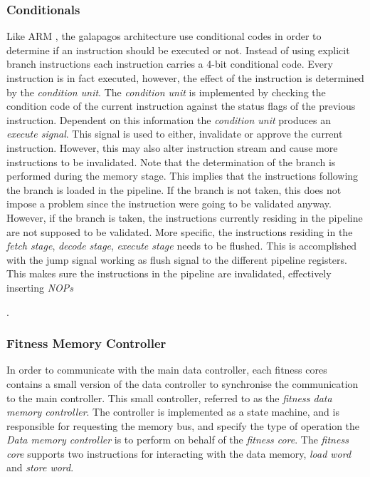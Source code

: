\subsubsection{Conditionals} 
Like ARM , the galapagos architecture use conditional codes in order to determine if an instruction should be executed or not. Instead of using explicit branch instructions each instruction carries a 4-bit conditional code. Every instruction is in fact executed, however, the effect of the instruction is determined by the \emph{condition unit}. The \emph{condition unit} is implemented by checking the condition code of the current instruction against the status flags of the previous instruction. Dependent on this information the \emph{condition unit} produces an \emph{execute signal}. This signal is used to either, invalidate or approve the current instruction. However, this may also alter instruction stream and cause more instructions to be invalidated. Note that the determination of the branch is performed during the memory stage. This implies that the instructions following the branch is loaded in the pipeline. If the branch is not taken, this does not impose a problem since the instruction were going to be validated anyway. However, if the branch is taken, the instructions currently residing in the pipeline are not supposed to be validated. More specific, the instructions residing in the \emph{fetch stage}, \emph{decode stage}, \emph{execute stage} needs to be flushed. This is accomplished with the jump signal working as flush signal to the different pipeline registers. This makes sure the instructions in the pipeline are invalidated, effectively inserting \emph{NOPs}




.




\subsubsection{Fitness Memory Controller} 
In order to communicate with the main data controller, each fitness cores contains a small version of the data controller to synchronise the communication to the main controller. This small controller, referred to as the \emph{fitness data memory controller}. The controller is implemented as a state machine, and is responsible for requesting the memory bus, and specify the type of operation the \emph{Data memory controller} is to perform on behalf of the \emph{fitness core}.  The \emph{fitness core} supports two instructions for interacting with the data memory,  \emph{load word} and \emph{store word}. 


